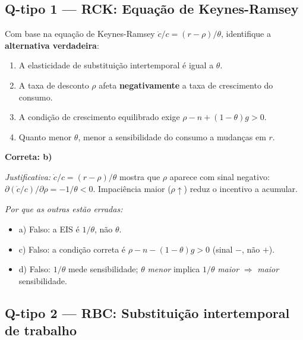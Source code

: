 \documentclass[12pt, a4paper]{article}
\begin{document}
\bigskip

\subsection*{Q-tipo 1 --- RCK: Equação de Keynes-Ramsey}

Com base na equação de Keynes-Ramsey $\dot{c}/c = (r-\rho)/\theta$, identifique
a \textbf{alternativa verdadeira}:

\begin{enumerate}[label=\textbf{\alph*)}, leftmargin=2em, itemsep=4pt]
  \item A elasticidade de substituição intertemporal é igual a $\theta$.
  \item A taxa de desconto $\rho$ afeta \textbf{negativamente} a taxa de crescimento
    do consumo.
  \item A condição de crescimento equilibrado exige $\rho - n + (1-\theta)g > 0$.
  \item Quanto menor $\theta$, menor a sensibilidade do consumo a mudanças em $r$.
\end{enumerate}

\begin{resultbox}[title={Resposta Q-tipo 1: alternativa b)}]
\textbf{Correta: b)}

\textit{Justificativa:} $\dot{c}/c = (r-\rho)/\theta$ mostra que $\rho$ aparece
com sinal negativo: $\partial(\dot{c}/c)/\partial\rho = -1/\theta < 0$.
Impaciência maior ($\rho\uparrow$) reduz o incentivo a acumular.

\textit{Por que as outras estão erradas:}
\begin{itemize}[leftmargin=1.5em, topsep=2pt, itemsep=2pt]
  \item a) Falso: a EIS é $1/\theta$, não $\theta$.
  \item c) Falso: a condição correta é $\rho - n - (1-\theta)g > 0$ (sinal $-$, não $+$).
  \item d) Falso: $1/\theta$ mede sensibilidade; $\theta$ \textit{menor} implica
    $1/\theta$ \textit{maior} $\Rightarrow$ \textit{maior} sensibilidade.
\end{itemize}
\end{resultbox}

\bigskip

\subsection*{Q-tipo 2 --- RBC: Substituição intertemporal de trabalho}
\end{document}
